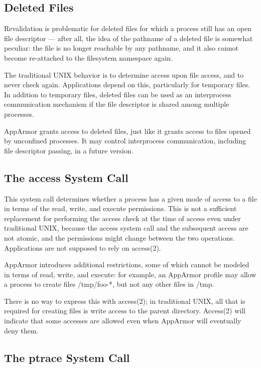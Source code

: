 \documentclass[a4paper]{article}
\begin{document}
\subsection{Deleted Files}

Revalidation is problematic for deleted files for which a process still
has an open file descriptor --- after all, the idea of the pathname of a
deleted file is somewhat peculiar: the file is no longer reachable by
any pathname, and it also cannot become re-attached to the filesystem
namespace again.

The traditional UNIX behavior is to determine access upon file access,
and to never check again. Applications depend on this, particularly for
temporary files.  In addition to temporary files, deleted files can be
used as an interprocess communication mechanism if the file descriptor
is shared among multiple processes.

AppArmor grants access to deleted files, just like it grants access to
files opened by unconfined processes.  It may control interprocess
communication, including file descriptor passing, in a future version.


\subsection{The access System Call}

This system call determines whether a process has a given mode of access
to a file in terms of the read, write, and execute permissions.  This is
not a sufficient replacement for performing the access check at the time
of access even under traditional UNIX, because the access system call
and the subsequent access are not atomic, and the permissions might
change between the two operations. Applications are not supposed to rely
on access(2).

AppArmor introduces additional restrictions, some of which cannot be
modeled in terms of read, write, and execute: for example, an AppArmor
profile may allow a process to create files /tmp/foo-*, but not any
other files in /tmp.

There is no way to express this with access(2); in traditional UNIX, all
that is required for creating files is write access to the parent
directory.  Access(2) will indicate that some accesses are allowed even
when AppArmor will eventually deny them.


\subsection{The ptrace System Call}
\end{document}
